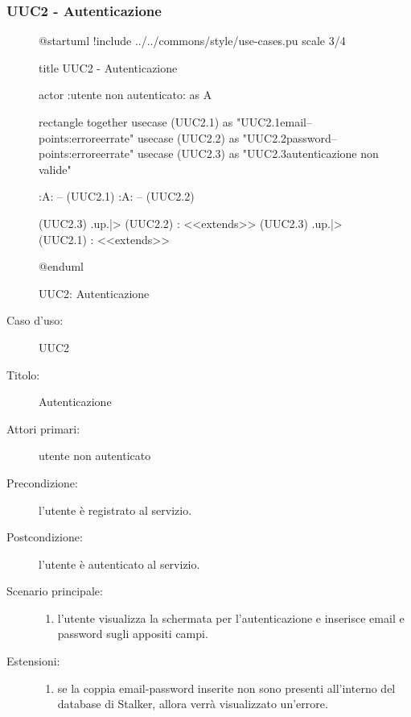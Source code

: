 \documentclass[casi-duso]{subfiles}
\begin{document}
\subsubsection{UUC2 - Autenticazione}%
\label{subsub:UUC2utente}

\begin{figure}[h!] 
  \centering 
  \begin{plantuml}
  @startuml
  !include ../../commons/style/use-cases.pu
  scale 3/4

  title UUC2 - Autenticazione
    
  actor :utente non autenticato: as A
    
  rectangle {
    together {
      usecase (UUC2.1) as "UUC2.1\nInserimento email\n--\nExtension points:\nVisualizzazione errore\ncredenziali errate"
      usecase (UUC2.2) as "UUC2.2\nInserimento password\n--\nExtension points:\nVisualizzazione errore\ncredenziali errate" 
      usecase (UUC2.3) as "UUC2.3\nInformazioni autenticazione non valide"     
    }
  }
    
  :A: -- (UUC2.1)
  :A: -- (UUC2.2)
    
  (UUC2.3) .up.|> (UUC2.2) : <<extends>>
  (UUC2.3) .up.|> (UUC2.1) : <<extends>>
    
  @enduml
  \end{plantuml} 
  \caption{UUC2: Autenticazione} 
  \label{fig:uuc2} 
\end{figure}

\begin{description}
  \item[Caso d’uso:] UUC2
  \item[Titolo:] Autenticazione
  \item[Attori primari:] utente non autenticato
  \item[Precondizione:] l'utente è registrato al servizio.
  \item[Postcondizione:] l'utente è autenticato al servizio.
  \item[Scenario principale:]
        \begin{enumerate}
          \item l'utente visualizza la schermata per l'autenticazione e inserisce email e password sugli appositi campi.
        \end{enumerate}
  \item[Estensioni:]
        \begin{enumerate}
          \item se la coppia email-password inserite non sono presenti all'interno del database di Stalker, allora verrà visualizzato un'errore.
        \end{enumerate}
\end{description}
\end{document}
